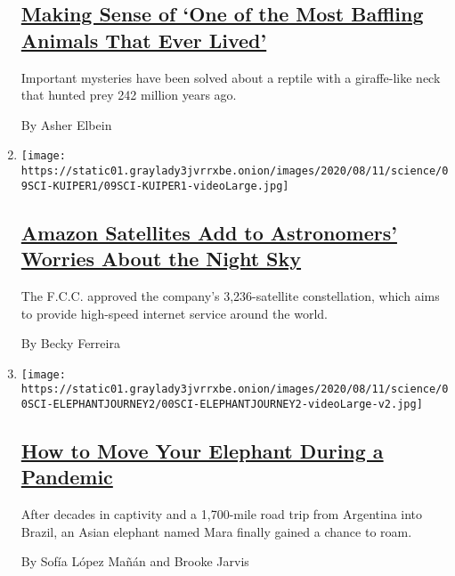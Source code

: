 \begin{enumerate}
{  \subsection{\texorpdfstring{\href{/2020/08/12/science/reptile-long-neck-fossil.html}{Making
  Sense of `One of the Most Baffling Animals That Ever
  Lived'}}{Making Sense of `One of the Most Baffling Animals That Ever Lived'}}\label{making-sense-of-one-of-the-most-baffling-animals-that-ever-lived}}

  Important mysteries have been solved about a reptile with a
  giraffe-like neck that hunted prey 242 million years ago.

  By Asher Elbein
\item
  \texttt{[image: https://static01.graylady3jvrrxbe.onion/images/2020/08/11/science/09SCI-KUIPER1/09SCI-KUIPER1-videoLarge.jpg]}

  \hypertarget{amazon-satellites-add-to-astronomers-worries-about-the-night-sky}{%
  \subsection{\texorpdfstring{\href{/2020/08/10/science/amazon-project-kuiper.html}{Amazon
  Satellites Add to Astronomers' Worries About the Night
  Sky}}{Amazon Satellites Add to Astronomers' Worries About the Night Sky}}\label{amazon-satellites-add-to-astronomers-worries-about-the-night-sky}}

  The F.C.C. approved the company's 3,236-satellite constellation, which
  aims to provide high-speed internet service around the world.

  By Becky Ferreira
\item
  \texttt{[image: https://static01.graylady3jvrrxbe.onion/images/2020/08/11/science/00SCI-ELEPHANTJOURNEY2/00SCI-ELEPHANTJOURNEY2-videoLarge-v2.jpg]}

  \hypertarget{how-to-move-your-elephant-during-a-pandemic}{%
  \subsection{\texorpdfstring{\href{/2020/08/09/science/coronavirus-elephants-wildlife-zoo.html}{How
  to Move Your Elephant During a
  Pandemic}}{How to Move Your Elephant During a Pandemic}}\label{how-to-move-your-elephant-during-a-pandemic}}

  After decades in captivity and a 1,700-mile road trip from Argentina
  into Brazil, an Asian elephant named Mara finally gained a chance to
  roam.

  By Sofía López Mañán and Brooke Jarvis
\end{enumerate}

